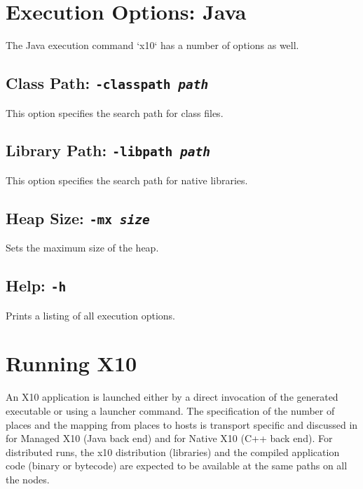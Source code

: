 \section{Execution Options: Java}

The Java execution command \xcd`x10` has a number of options as well. 

\subsection{Class Path: {\tt -classpath {\em path}}}

This option specifies the search path for class files. 

\subsection{Library Path: {\tt -libpath {\em path}}}

This option specifies the search path for native libraries.

\subsection{Heap Size: {\tt -mx {\em size}}}

Sets the maximum size of the heap. 

\subsection{Help: {\tt -h}}

Prints a listing of all execution options.





\section{Running X10}

An X10 application is launched either by a direct invocation of the generated
executable or using a launcher command. The specification of the number of
places and the mapping from places to hosts is transport specific and
discussed in  for Managed X10 (Java back end) and
 for Native X10 (C++ back end). For distributed runs,
the x10 distribution (libraries) and the compiled application code (binary or
bytecode) are expected to be available at the same paths on all the nodes.  

